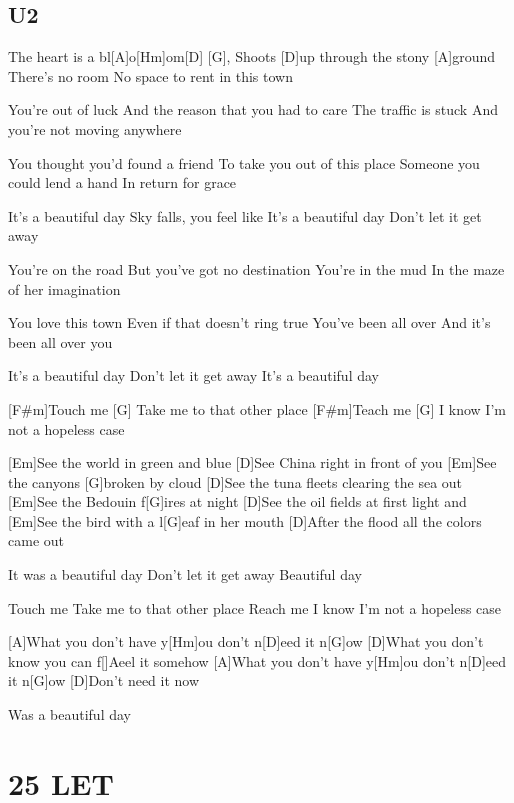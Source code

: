 \documentclass{article}
\begin{document}
\subsection*{U2}
\begin{guitar}

		
	The heart is a bl[A]o[Hm]om[D] [G],
	Shoots [D]up through the stony [A]ground
	There's no room
	No space to rent in this town

	You're out of luck
	And the reason that you had to care
	The traffic is stuck
	And you're not moving anywhere

	You thought you'd found a friend
	To take you out of this place
	Someone you could lend a hand
	In return for grace

	It's a beautiful day
	Sky falls, you feel like
	It's a beautiful day
	Don't let it get away

	You're on the road
	But you've got no destination
	You're in the mud
	In the maze of her imagination

	You love this town
	Even if that doesn't ring true
	You've been all over
	And it's been all over you

	It's a beautiful day
	Don't let it get away
	It's a beautiful day

	[F#m]Touch me [G] 
	Take me to that other place
	[F#m]Teach me [G] 
	I know I'm not a hopeless case

	[Em]See the world in green and blue
	[D]See China right in front of you
	[Em]See the canyons [G]broken by cloud
	[D]See the tuna fleets clearing the sea out
	[Em]See the Bedouin f[G]ires at night
	[D]See the oil fields at first light and
	[Em]See the bird with a l[G]eaf in her mouth
	[D]After the flood all the colors came out

	It was a beautiful day
	Don't let it get away
	Beautiful day

	Touch me
	Take me to that other place
	Reach me
	I know I'm not a hopeless case

	[A]What you don't have y[Hm]ou don't n[D]eed it n[G]ow
	[D]What you don't know you can f[]Aeel it somehow
	[A]What you don't have y[Hm]ou don't n[D]eed it n[G]ow
	[D]Don't need it now

	Was a beautiful day 
	
\end{guitar}

\section*{25 LET}
%
\end{document}
